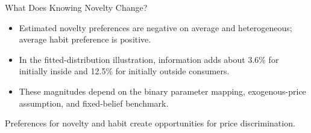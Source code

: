 \documentclass[aspectratio=169,professionalfonts]{beamer}
\newcommand{\shortbuttons}{}
\begin{document}
\gdef\shortbuttons{}
\begin{frame}[label=short-50]{What Does Knowing Novelty Change?}
  \begin{itemize}
    \item Estimated novelty preferences are negative on average and heterogeneous; average habit preference is positive.
    \item In the fitted-distribution illustration, information adds about 3.6\% for initially inside and 12.5\% for initially outside consumers.
    \item These magnitudes depend on the binary parameter mapping, exogenous-price assumption, and fixed-belief benchmark.
  \end{itemize}
  \begin{tcolorbox}
    Preferences for novelty and habit create opportunities for price discrimination.
  \end{tcolorbox}
\end{frame}





\appendix

\end{document}
